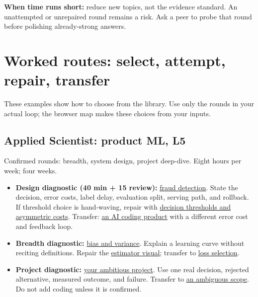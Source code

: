 \documentclass[10pt,letterpaper]{article}
\begin{document}
\textbf{When time runs short:} reduce new topics, not the evidence standard. An unattempted or unrepaired round remains a risk. Ask a peer to probe that round before polishing already-strong answers.

\newpage
\section*{Worked routes: select, attempt, repair, transfer}
These examples show how to choose from the library. Use only the rounds in your actual loop; the browser map makes these choices from your inputs.

\subsection*{Applied Scientist: product ML, L5}
Confirmed rounds: breadth, system design, project deep-dive. Eight hours per week; four weeks.
\begin{itemize}
  \item \textbf{Design diagnostic (40 min + 15 review):} \href{https://mlmentorship.com/questions/design-fraud-detection/?practice=1}{fraud detection}. State the decision, error costs, label delay, evaluation split, serving path, and rollback. If threshold choice is hand-waving, repair with \href{https://mlmentorship.com/review/\#decision-thresholds-asymmetric-costs-abstention}{decision thresholds and asymmetric costs}. Transfer: \href{https://mlmentorship.com/questions/design-ai-coding-product/?practice=1}{an AI coding product} with a different error cost and feedback loop.
  \item \textbf{Breadth diagnostic:} \href{https://mlmentorship.com/questions/bias-variance-tradeoff/?practice=1}{bias and variance}. Explain a learning curve without reciting definitions. Repair the \href{https://mlmentorship.com/review/\#bias-variance-of-estimators}{estimator visual}; transfer to \href{https://mlmentorship.com/questions/how-to-choose-loss-function/?practice=1}{loss selection}.
  \item \textbf{Project diagnostic:} \href{https://mlmentorship.com/questions/most-ambitious-project/?practice=1}{your ambitious project}. Use one real decision, rejected alternative, measured outcome, and failure. Transfer to \href{https://mlmentorship.com/questions/scope-ambiguous-problem/?practice=1}{an ambiguous scope}. Do not add coding unless it is confirmed.
\end{itemize}
\end{document}
